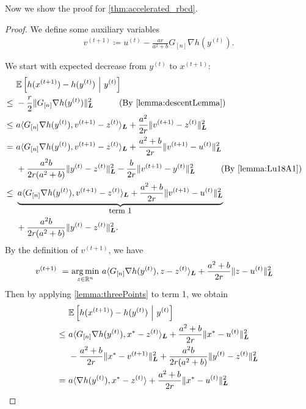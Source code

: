 Now we show the proof for \autoref{thm:accelerated_rbcd}. 
\begin{proof}
We define some auxiliary variables
\begin{align*}
    v^{(t+1)} \coloneqq u^{(t)} - \frac{ar}{a^2 + b} G_{[n]} \nabla h(y^{(t)}).
\end{align*}

We start with expected decrease from $y^{(t)}$ to $x^{(t+1)}$:
\begin{align*}
    & \mE \left[ h( x^{(t+1)} ) - h(y^{(t)}) ~\Big|~ y^{(t)}  \right] \\
    \leq~& -\frac{r}{2} \| G_{[n]} \nabla h( y^{(t)} ) \|_{\bL}^2  \qquad \text{(By \autoref{lemma:descentLemma})} \\
    \leq~& a \langle G_{[n]} \nabla h( y^{(t)} ), v^{(t+1)} - z^{(t)} \rangle_{\bL} + \frac{a^2}{2r} \| v^{(t+1)} - z^{(t)} \|_{\bL}^2   \\
=~& a \langle G_{[n]} \nabla h( y^{(t)} ), v^{(t+1)} - z^{(t)} \rangle_{\bL} + \frac{a^2+b}{2r} \| v^{(t+1)} - u^{(t)} \|_{\bL}^2 \\&+ \frac{a^2b}{2r(a^2+b)} \| y^{(t)} - z^{(t)} \|_{\bL}^2 -  \frac{b}{2r} \| v^{(t+1)} - y^{(t)} \|_{\bL}^2 \qquad \text{(By \autoref{lemma:Lu18A1})} \\
\leq~& \underbrace{a \langle G_{[n]} \nabla h( y^{(t)} ), v^{(t+1)} - z^{(t)} \rangle_{\bL} + \frac{a^2+b}{2r} \| v^{(t+1)} - u^{(t)} \|_{\bL}^2}_{\mbox{\small term 1}}\\ 
&+ \frac{a^2b}{2r(a^2+b)} \| y^{(t)} - z^{(t)} \|_{\bL}^2.
\end{align*}
By the definition of $v^{(t+1)}$, we have
\begin{align*}
    v^{(t+1)} ~=~ & \underset{z \in \mathbb{R}^n}{\arg\min} ~a \langle G_{[n]} \nabla h(y^{(t)}), z - z^{(t)} \rangle_{\boldsymbol{L}} + \frac{a^2+b}{2r} \| z - u^{(t)} \|_{\boldsymbol{L}}^2 
\end{align*}
Then by applying \autoref{lemma:threePoints} to term 1, we obtain
\begin{equation} \label{eq:accRBCDStronglyCVX1}
\begin{split}
    & \mE \left[ h( x^{(t+1)} ) - h(y^{(t)}) ~\Big|~ y^{(t)}  \right] \\
    \leq~& a \langle G_{[n]} \nabla h( y^{(t)} ), x^* - z^{(t)} \rangle_{\bL} + \frac{a^2+b}{2r} \| x^* - u^{(t)} \|_{\bL}^2 \\
    &- \frac{a^2+b}{2r} \| x^* - v^{(t+1)} \|_{\bL}^2 + \frac{a^2b}{2r(a^2+b)} \| y^{(t)} - z^{(t)} \|_{\bL}^2 \\
    =~& a \langle \nabla h( y^{(t)} ), x^* - z^{(t)} \rangle + \frac{a^2+b}{2r} \| x^* - u^{(t)} \|_{\bL}^2 \\

\end{split}
\end{equation}
\end{proof}

